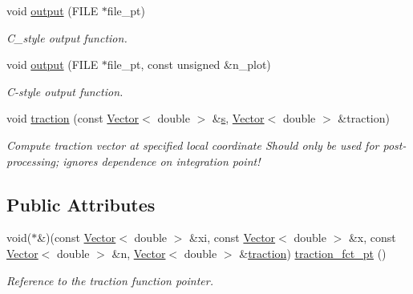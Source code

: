 \begin{DoxyCompactItemize}
void \hyperlink{classoomph_1_1SolidTractionElement_adad3b3f82a9537c6fbe172143d5f6c44}{output} (F\+I\+LE $\ast$file\+\_\+pt)
\begin{DoxyCompactList}\small\item\em C\+\_\+style output function. \end{DoxyCompactList}\item 
void \hyperlink{classoomph_1_1SolidTractionElement_ae96f69a6485b2f788a60f139abc0a93f}{output} (F\+I\+LE $\ast$file\+\_\+pt, const unsigned \&n\+\_\+plot)
\begin{DoxyCompactList}\small\item\em C-\/style output function. \end{DoxyCompactList}\item 
void \hyperlink{classoomph_1_1SolidTractionElement_ab00a3429962eb33612054e82095f8082}{traction} (const \hyperlink{classoomph_1_1Vector}{Vector}$<$ double $>$ \&\hyperlink{cfortran_8h_ab7123126e4885ef647dd9c6e3807a21c}{s}, \hyperlink{classoomph_1_1Vector}{Vector}$<$ double $>$ \&traction)
\begin{DoxyCompactList}\small\item\em Compute traction vector at specified local coordinate Should only be used for post-\/processing; ignores dependence on integration point! \end{DoxyCompactList}\end{DoxyCompactItemize}
\subsection*{Public Attributes}
\begin{DoxyCompactItemize}
\item 
void($\ast$\&)(const \hyperlink{classoomph_1_1Vector}{Vector}$<$ double $>$ \&xi, const \hyperlink{classoomph_1_1Vector}{Vector}$<$ double $>$ \&x, const \hyperlink{classoomph_1_1Vector}{Vector}$<$ double $>$ \&n, \hyperlink{classoomph_1_1Vector}{Vector}$<$ double $>$ \&\hyperlink{classoomph_1_1SolidTractionElement_ab00a3429962eb33612054e82095f8082}{traction}) \hyperlink{classoomph_1_1SolidTractionElement_a1ed29876e72ccd4ee0ed41f74bd1470b}{traction\+\_\+fct\+\_\+pt} ()
\begin{DoxyCompactList}\small\item\em Reference to the traction function pointer. \end{DoxyCompactList}\end{DoxyCompactItemize}
